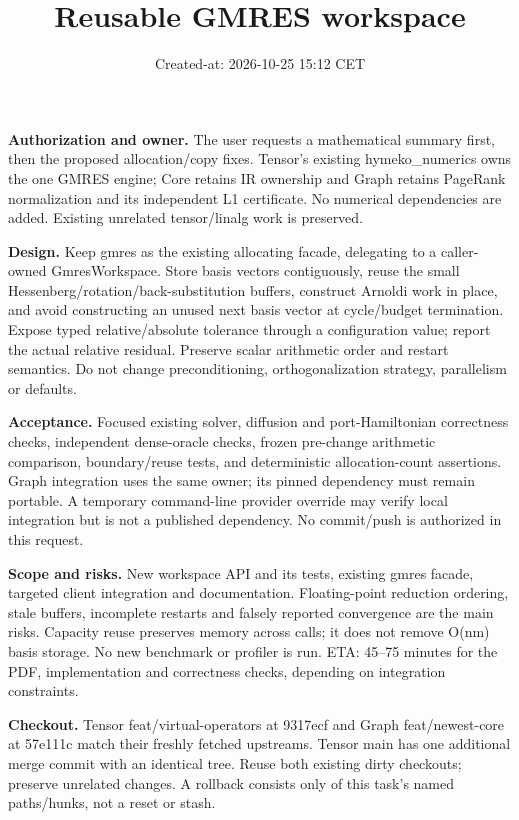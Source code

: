 \documentclass[10pt,a4paper]{article}
\title{Reusable GMRES workspace}\date{Created-at: 2026-10-25 15:12 CET}
\begin{document}
\maketitle
\textbf{Authorization and owner.} The user requests a mathematical summary first,
then the proposed allocation/copy fixes. Tensor's existing hymeko\_numerics owns
the one GMRES engine; Core retains IR ownership and Graph retains PageRank
normalization and its independent L1 certificate. No numerical dependencies are added.
Existing unrelated tensor/linalg work is preserved.

\textbf{Design.} Keep gmres as the existing allocating facade, delegating to a
caller-owned GmresWorkspace. Store basis vectors contiguously, reuse the small
Hessenberg/rotation/back-substitution buffers, construct Arnoldi work in place,
and avoid constructing an unused next basis vector at cycle/budget termination.
Expose typed relative/absolute tolerance through a configuration value; report
the actual relative residual. Preserve scalar arithmetic order and restart semantics.
Do not change preconditioning, orthogonalization strategy, parallelism or defaults.

\textbf{Acceptance.} Focused existing solver, diffusion and port-Hamiltonian
correctness checks, independent dense-oracle checks, frozen pre-change arithmetic
comparison, boundary/reuse tests, and deterministic allocation-count assertions.
Graph integration uses the same owner; its pinned dependency must remain portable.
A temporary command-line provider override may verify local integration but is
not a published dependency. No commit/push is authorized in this request.

\textbf{Scope and risks.} New workspace API and its tests, existing gmres facade,
targeted client integration and documentation. Floating-point reduction ordering,
stale buffers, incomplete restarts and falsely reported convergence are the main
risks. Capacity reuse preserves memory across calls; it does not remove O(nm)
basis storage. No new benchmark or profiler is run. ETA: 45--75 minutes for the
PDF, implementation and correctness checks, depending on integration constraints.

\textbf{Checkout.} Tensor feat/virtual-operators at 9317ecf and Graph
feat/newest-core at 57e111c match their freshly fetched upstreams. Tensor main has
one additional merge commit with an identical tree. Reuse both existing dirty
checkouts; preserve unrelated changes. A rollback consists only of this task's
named paths/hunks, not a reset or stash.
\end{document}

